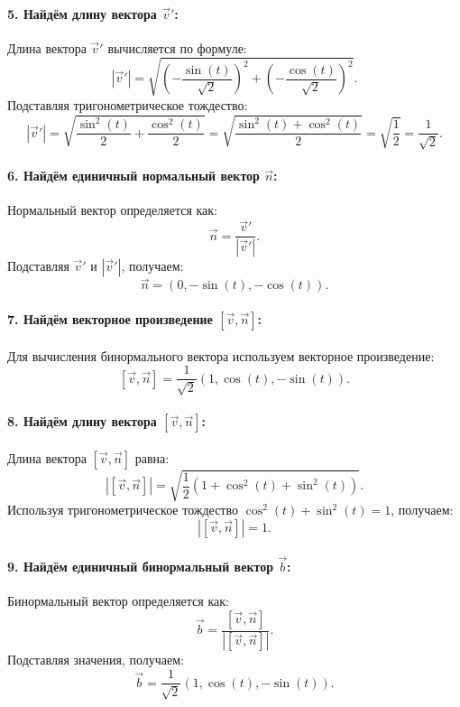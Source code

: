 \documentclass{article}
\begin{document}
        \paragraph{5. Найдём длину вектора \(\vec{v}'\):}
        Длина вектора \(\vec{v}'\) вычисляется по формуле:
        \[
        \left|\vec{v}'\right| = \sqrt{\left(-\frac{\sin(t)}{\sqrt{2}}\right)^2 + \left(-\frac{\cos(t)}{\sqrt{2}}\right)^2}.
        \]
        Подставляя тригонометрическое тождество:
        \[
        \left|\vec{v}'\right| = \sqrt{\frac{\sin^2(t)}{2} + \frac{\cos^2(t)}{2}} = \sqrt{\frac{\sin^2(t) + \cos^2(t)}{2}} = \sqrt{\frac{1}{2}} = \frac{1}{\sqrt{2}}.
        \]
        
        \paragraph{6. Найдём единичный нормальный вектор \(\vec{n}\):}
        Нормальный вектор определяется как:
        \[
        \vec{n} = \frac{\vec{v}'}{\left|\vec{v}'\right|}.
        \]
        Подставляя \(\vec{v}'\) и \(\left|\vec{v}'\right|\), получаем:
        \[
        \vec{n} = (0, -\sin(t), -\cos(t)).
        \]
        
        \paragraph{7. Найдём векторное произведение \([\vec{v}, \vec{n}]\):}
        Для вычисления бинормального вектора используем векторное произведение:
        \[
        [\vec{v}, \vec{n}] = \frac{1}{\sqrt{2}}(1, \cos(t), -\sin(t)).
        \]
        
        \paragraph{8. Найдём длину вектора \([\vec{v}, \vec{n}]\):}
        Длина вектора \([\vec{v}, \vec{n}]\) равна:
        \[
        \left|[\vec{v}, \vec{n}]\right| = \sqrt{\frac{1}{2}(1 + \cos^2(t) + \sin^2(t))}.
        \]
        Используя тригонометрическое тождество \( \cos^2(t) + \sin^2(t) = 1 \), получаем:
        \[
        \left|[\vec{v}, \vec{n}]\right| = 1.
        \]
        
        \paragraph{9. Найдём единичный бинормальный вектор \(\vec{b}\):}
        Бинормальный вектор определяется как:
        \[
        \vec{b} = \frac{[\vec{v}, \vec{n}]}{\left|[\vec{v}, \vec{n}]\right|}.
        \]
        Подставляя значения, получаем:
        \[
        \vec{b} = \frac{1}{\sqrt{2}}(1, \cos(t), -\sin(t)).
        \]
        
\end{document}
